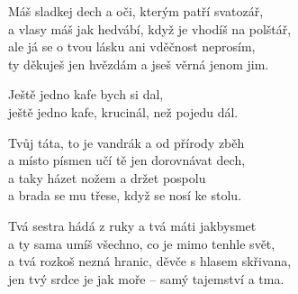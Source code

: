 
\ve{}
Máš sladkej dech a oči, kterým patří svatozář,\\
a vlasy máš jak hedvábí, když je vhodíš na polštář,\\
ale já se o tvou lásku ani vděčnost neprosím,\\
ty děkuješ jen hvězdám a jseš věrná jenom jim.

\cho{}
Ještě jedno kafe bych si dal,\\
ještě jedno kafe, krucinál, než pojedu dál. \quad {} \quad {} \quad {}

\ve{}
Tvůj táta, to je vandrák a od přírody zběh\\
a místo písmen učí tě jen dorovnávat dech,\\
a taky házet nožem a držet pospolu\\
a brada se mu třese, když se nosí ke stolu.

\cho{}

\ve{} 
Tvá sestra hádá z ruky a tvá máti jakbysmet\\
a ty sama umíš všechno, co je mimo tenhle svět,\\
a tvá rozkoš nezná hranic, děvče s hlasem skřivana,\\
jen tvý srdce je jak moře -- samý tajemství a tma.

\cho{}

\esong{}